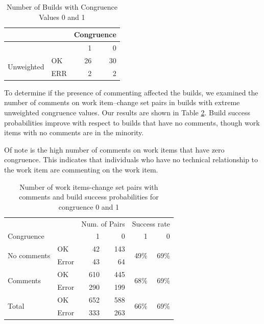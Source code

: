 \begin{table}[t]
\centering
\begin{tabular}{llrr}
\toprule
& & \multicolumn{2}{c}{Congruence} \\\midrule
&  & 1 & 0 \\\midrule
\multirow{2}{*}{Unweighted} & OK & 26 & 30 \\
                            & ERR & 2 & 2 \\%
 \bottomrule
\end{tabular}
\caption{Number of Builds with Congruence Values 0 and 1}
\label{tab:congruence_extremes}
\end{table}

To determine if the presence of commenting affected the builds, we examined the number of comments on work item--change set pairs in builds with extreme unweighted congruence values. Our results are shown in Table \ref{tab:changeset_commenters}. Build success probabilities improve with respect to builds that have no comments, though work items with no comments are in the minority.

Of note is the high number of comments on work items that have zero congruence. This indicates that individuals who have no technical relationship to the work item are commenting on the work item.

\begin{table}[t]
\centering
\begin{tabular}{ll|rr|rr}
& & \multicolumn{2}{c|}{Num. of Pairs} & \multicolumn{2}{c}{Success rate} \\
Congruence &                                & 1     & 0   & 1 & 0 \\\hline 
\multirow{2}{*}{No comments} 	& OK 	  & 42   & 143  &  \multirow{2}{*}{49\%} & \multirow{2}{*}{69\%}  \\
                            	& Error   & 43    & 64   &  & \\\hline
\multirow{2}{*}{Comments} 	& OK 	  & 610  & 445  & \multirow{2}{*}{68\%} & \multirow{2}{*}{69\%}  \\
                         	& Error   & 290   & 199  &  & \\\hline
\multirow{2}{*}{Total} 		& OK		  & 652 & 588 &     \multirow{2}{*}{66\%} & \multirow{2}{*}{69\%}   \\
                       		& Error   & 333  & 263 & &\\
\end{tabular}
\caption{Number of work items-change set pairs with comments and build success probabilities for congruence 0 and 1}
\label{tab:changeset_commenters}
\end{table}

